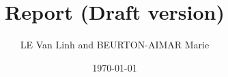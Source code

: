\title{Report (Draft version)}
\author{LE Van Linh and BEURTON-AIMAR Marie}
\date{\today}
\maketitle